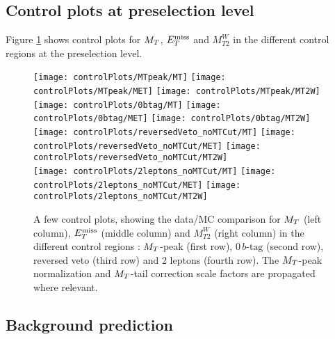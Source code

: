         \subsection{Control plots at preselection level}

        Figure \ref{fig:preselControlPlots} shows control plots for $M_T$, $E_T^\text{miss}$ and $M_{T2}^W$ in the different control regions at the preselection level. 

            \begin{figure}[h!]
                \centering
                \texttt{[image: controlPlots/MTpeak/MT]}
                \texttt{[image: controlPlots/MTpeak/MET]}
                \texttt{[image: controlPlots/MTpeak/MT2W]}\\
                \texttt{[image: controlPlots/0btag/MT]}
                \texttt{[image: controlPlots/0btag/MET]}
                \texttt{[image: controlPlots/0btag/MT2W]}\\
                \texttt{[image: controlPlots/reversedVeto\_noMTCut/MT]}
                \texttt{[image: controlPlots/reversedVeto\_noMTCut/MET]}
                \texttt{[image: controlPlots/reversedVeto\_noMTCut/MT2W]}\\
                \texttt{[image: controlPlots/2leptons\_noMTCut/MT]}
                \texttt{[image: controlPlots/2leptons\_noMTCut/MET]}
                \texttt{[image: controlPlots/2leptons\_noMTCut/MT2W]}\\
                \caption{A few control plots, showing the data/MC comparison for $M_T$ (left column),
                        $E_T^\text{miss}$ (middle column) and $M_{T2}^W$ (right column) in the different control
                        regions : $M_T$-peak (first row), $0\, b\text{-tag}$ (second row), reversed veto (third
                        row) and 2 leptons (fourth row). The $M_T$-peak normalization and $M_T$-tail
                        correction scale factors are propagated where relevant.}
                        \label{fig:preselControlPlots}
            \end{figure}

        \subsection{Background prediction}

